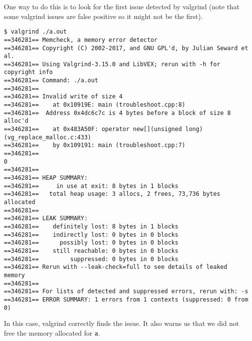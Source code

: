 \documentclass{article}
\begin{document}
One way to do this is to look for the first issue detected by valgrind (note that some valgrind issues are false positive so it might not be the first).
\begin{verbatim}
$ valgrind ./a.out
==346281== Memcheck, a memory error detector
==346281== Copyright (C) 2002-2017, and GNU GPL'd, by Julian Seward et al.
==346281== Using Valgrind-3.15.0 and LibVEX; rerun with -h for copyright info
==346281== Command: ./a.out
==346281==
==346281== Invalid write of size 4
==346281==    at 0x10919E: main (troubleshoot.cpp:8)
==346281==  Address 0x4dc6c7c is 4 bytes before a block of size 8 alloc'd
==346281==    at 0x483A50F: operator new[](unsigned long) (vg_replace_malloc.c:433)
==346281==    by 0x109191: main (troubleshoot.cpp:7)
==346281==
0
==346281==
==346281== HEAP SUMMARY:
==346281==     in use at exit: 8 bytes in 1 blocks
==346281==   total heap usage: 3 allocs, 2 frees, 73,736 bytes allocated
==346281==
==346281== LEAK SUMMARY:
==346281==    definitely lost: 8 bytes in 1 blocks
==346281==    indirectly lost: 0 bytes in 0 blocks
==346281==      possibly lost: 0 bytes in 0 blocks
==346281==    still reachable: 0 bytes in 0 blocks
==346281==         suppressed: 0 bytes in 0 blocks
==346281== Rerun with --leak-check=full to see details of leaked memory
==346281==
==346281== For lists of detected and suppressed errors, rerun with: -s
==346281== ERROR SUMMARY: 1 errors from 1 contexts (suppressed: 0 from 0)
\end{verbatim}
In this case, valgrind correctly finds the issue.
It also warns us that we did not free the memory allocated for \texttt{a}.
\end{document}
